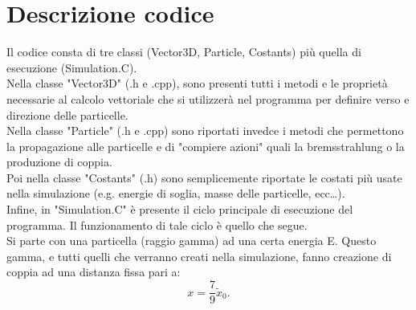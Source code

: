 \documentclass[10pt,a4paper,usenatbib]{article}
\begin{document}
\section{Descrizione codice}
Il codice consta di tre classi (Vector3D, Particle, Costants) più quella di esecuzione (Simulation.C). 
\\Nella classe "Vector3D" (.h e .cpp), sono presenti tutti i metodi e le proprietà necessarie al calcolo vettoriale che si utilizzerà nel programma per definire verso e direzione delle particelle. 
\\Nella classe "Particle" (.h e .cpp) sono riportati invedce i metodi che permettono la propagazione alle particelle e di "compiere azioni" quali la bremsstrahlung o la produzione di coppia. 
\\Poi nella classe "Costants" (.h) sono semplicemente riportate le costati più usate nella simulazione (e.g. energie di soglia, masse delle particelle, ecc\dots). 
\\Infine, in "Simulation.C" è presente il ciclo principale di esecuzione del programma. Il funzionamento di tale ciclo è quello che segue. 
\\Si parte con una particella (raggio gamma) ad una certa energia E. Questo gamma, e tutti quelli che verranno creati nella simulazione, fanno creazione di coppia ad una distanza fissa pari a: 
\begin{equation}
x = \frac{7}{9}\tilde{x}_0. 
\end{equation}
\end{document}
